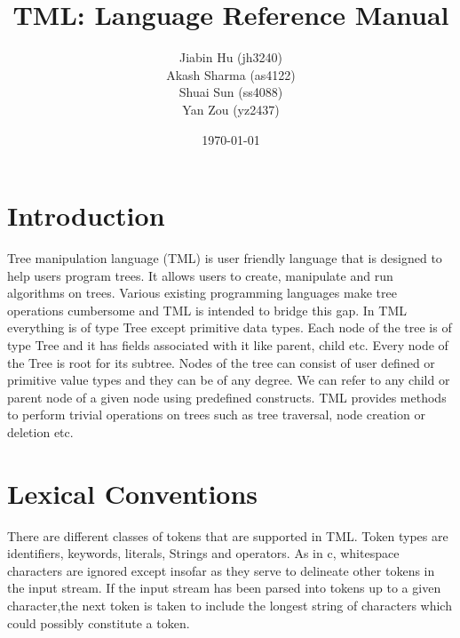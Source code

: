 \documentclass[12pt,psfig,a4]{article}
\begin{document}
 
\pagestyle{plain} 
\newenvironment{code}
{\sffamily
 \setlength{\parskip}{0pt}}
{}


\title{TML: Language Reference Manual}
\author{
Jiabin Hu (jh3240)\\
Akash Sharma (as4122)\\
Shuai Sun (ss4088)\\
Yan Zou (yz2437)
}
\date{\today}
\maketitle





\section{Introduction}

Tree manipulation language (TML) is user friendly language that is designed to help users program trees. It allows users to create, manipulate and run algorithms on trees. Various existing programming languages make tree operations cumbersome and TML is intended to bridge this gap. In TML everything is of type Tree except primitive data types. Each node of the tree is of type Tree and it has fields associated with it like parent, child etc. Every node of the Tree is root for its subtree. Nodes of the tree can consist of user defined or primitive value types and they can be of any degree. We can refer to any child or parent node of a given node using predefined constructs. TML provides methods to perform trivial operations on trees such as tree traversal, node creation or deletion etc.

\section{Lexical Conventions} \label{lexCon}
There are different classes of tokens that are supported in TML. Token types are identifiers, keywords, literals, Strings and operators. As in c, whitespace characters are ignored except insofar as they serve to delineate other tokens in the input stream. If the input stream has been parsed into tokens up to a given character,the next token is taken to include the longest string of characters which could possibly constitute a token.
\end{document}

